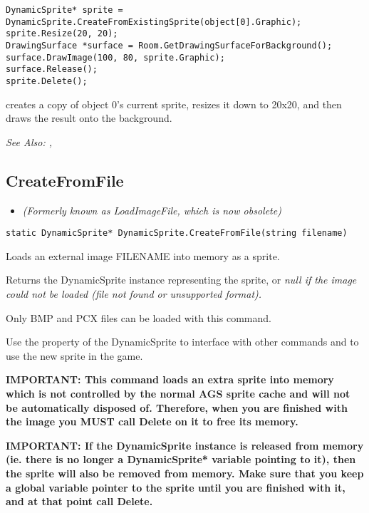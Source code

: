 \begin{verbatim}
DynamicSprite* sprite = DynamicSprite.CreateFromExistingSprite(object[0].Graphic);
sprite.Resize(20, 20);
DrawingSurface *surface = Room.GetDrawingSurfaceForBackground();
surface.DrawImage(100, 80, sprite.Graphic);
surface.Release();
sprite.Delete();
\end{verbatim}
creates a copy of object 0's current sprite, resizes it down to 20x20, and then draws
the result onto the background.

\it{See Also:} ,


\subsection{CreateFromFile}\label{DynamicSprite.CreateFromFile}%

\begin{itemize}
\item \it{(Formerly known as LoadImageFile, which is now obsolete)}
\end{itemize}

\begin{verbatim}
static DynamicSprite* DynamicSprite.CreateFromFile(string filename)
\end{verbatim}
Loads an external image FILENAME into memory as a sprite.

Returns the DynamicSprite instance representing the sprite, or \it{null} if the image
could not be loaded (file not found or unsupported format).

Only BMP and PCX files can be loaded with this command.

Use the  property of the DynamicSprite to
interface with other commands and to use the new sprite in the game.

\bf{IMPORTANT:} This command loads an extra sprite into memory which is not controlled
by the normal AGS sprite cache and will not be automatically disposed of. Therefore, when
you are finished with the image you \bf{MUST} call Delete on it to free its memory.

\bf{IMPORTANT:} If the DynamicSprite instance is released from memory (ie. there is
no longer a DynamicSprite* variable pointing to it), then the sprite will also be
removed from memory. Make sure that you keep a global variable pointer to the sprite
until you are finished with it, and at that point call Delete.

